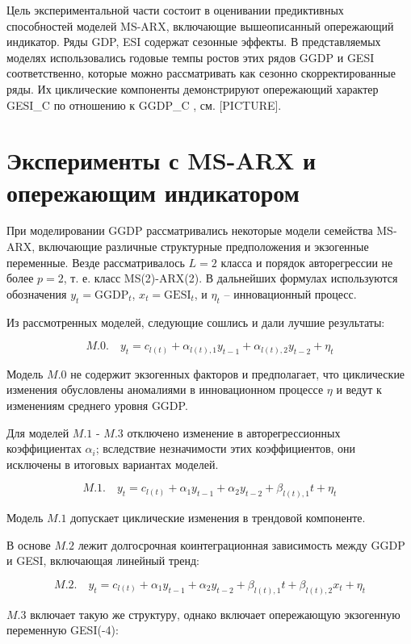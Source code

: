 \documentclass[a4paper,14pt]{extreport}
\begin{document}
Цель экспериментальной части \cite{mak_mal_bv_2020} состоит в оценивании предиктивных способностей моделей MS-ARX, включающие вышеописанный опережающий индикатор. Ряды GDP, ESI содержат сезонные эффекты. В представляемых моделях использовались годовые темпы ростов этих рядов GGDP и GESI соответственно, которые можно рассматривать как сезонно скорректированные ряды. Их циклические компоненты демонстрируют опережающий характер GESI\_C по отношению к GGDP\_C \cite{mak_mal_bv_2020}, см. [PICTURE].


\section{Эксперименты с MS-ARX и опережающим индикатором}

При моделировании GGDP рассматривались некоторые модели семейства MS-ARX, включающие различные структурные предположения и экзогенные переменные. Везде рассматривалось $L=2$ класса и порядок авторегрессии не более $p=2$, т. е. класс MS(2)-ARX(2). В дальнейших формулах используются обозначения $y_t = \text{GGDP}_t$, $x_t = \text{GESI}_t$, и $\eta_t$ -- инновационный процесс.

Из рассмотренных моделей, следующие сошлись и дали лучшие результаты:

\[
	M.0. \quad y_t = c_{l(t)} + \alpha_{l(t), 1} y_{t-1} + \alpha_{l(t), 2} y_{t-2} + \eta_t
\]

Модель $M.0$ не содержит экзогенных факторов и предполагает, что циклические изменения обусловлены аномалиями в инновационном процессе $\eta$ и ведут к изменениям среднего уровня GGDP.

Для моделей $M.1$ - $M.3$ отключено изменение в авторегрессионных коэффициентах $\alpha_i$; вследствие незначимости этих коэффициентов, они исключены в итоговых вариантах моделей.

\[
	M.1. \quad y_t = c_{l(t)} + \alpha_1 y_{t-1} + \alpha_2 y_{t-2} + \beta_{l(t), 1} t + \eta_t
\]

Модель $M.1$ допускает циклические изменения в трендовой компоненте. 

В основе $M.2$ лежит долгосрочная коинтеграционная зависимость между GGDP и GESI, включающая линейный тренд:

\[
	M.2. \quad y_t = c_{l(t)} + \alpha_1 y_{t-1} + \alpha_2 y_{t-2} + \beta_{l(t), 1} t + \beta_{l(t), 2} x_{t} + \eta_t
\]

$M.3$ включает такую же структуру, однако включает опережающую экзогенную переменную GESI(-4):
\end{document}
